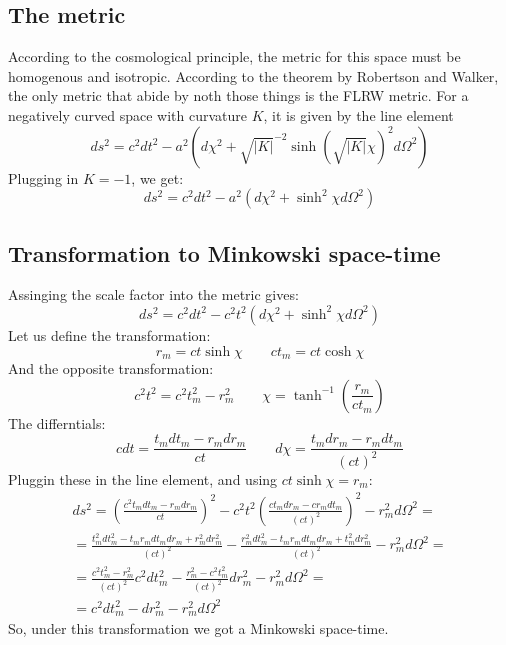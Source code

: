 \documentclass{article}
\begin{document}
\subsection{The metric}
According to the cosmological principle, the metric for this space must be homogenous and isotropic. According to the theorem by Robertson and Walker, the only metric that abide by noth those things is the FLRW metric. For a negatively curved space with curvature $K$, it is given by the line element
\begin{equation}
    ds^2 = c^2dt^2 - a^2\left(
        d\chi^2 + \sqrt{|K|}^{-2}\sinh(\sqrt{|K|}\chi)^2d\Omega^2
    \right)
\end{equation}
Plugging in $K = -1$, we get:
\begin{equation}
    ds^2 = c^2dt^2 - a^2\left(
        d\chi^2 + \sinh^2 \chi d\Omega^2
    \right)
\end{equation}

\subsection{Transformation to Minkowski space-time}
Assinging the scale factor into the metric gives:
\begin{equation}
    ds^2 = c^2dt^2 - c^2t^2\left(
        d\chi^2 + \sinh^2 \chi d\Omega^2
    \right)
\end{equation}
Let us define the transformation:
\begin{equation}
    r_m = ct \sinh \chi
    \qquad
    ct_m = ct \cosh \chi
\end{equation}
And the opposite transformation:
\begin{equation}
    c^2t^2 = c^2t_m^2 - r_m^2
    \qquad
    \chi = \tanh^{-1}\left(\frac{r_m}{ct_m}\right)
\end{equation}
The differntials:
\begin{equation}
    cdt = \frac{t_m dt_m - r_m dr_m}{ct}
    \qquad
    d\chi = \frac{t_m dr_m - r_m dt_m}{(ct)^2}
\end{equation}
Pluggin these in the line element, and using $ct\sinh\chi = r_m$:
\begin{equation}
\begin{gathered}
    ds^2 = \left(\frac{c^2t_m dt_m - r_m dr_m}{ct}\right)^2 - c^2t^2\left(\frac{ct_m dr_m - cr_m dt_m}{(ct)^2}\right)^2 - r_m^2 d\Omega^2 = \\ =
    \frac{t_m^2 dt_m^2 - t_m r_m dt_m dr_m + r_m^2 dr_m^2}{(ct)^2} - \frac{r_m^2 dt_m^2 - t_m r_m dt_m dr_m + t_m^2 dr_m^2}{(ct)^2} - r_m^2 d\Omega^2 = \\ =
    \frac{c^2t_m^2 - r_m^2}{(ct)^2}c^2dt_m^2 - \frac{r_m^2 - c^2t_m^2}{(ct)^2}dr_m^2 - r_m^2 d\Omega^2 = \\ =
    c^2dt_m^2 - dr_m^2 - r_m^2 d\Omega^2 
\end{gathered}
\end{equation}
So, under this transformation we got a Minkowski space-time.
\end{document}
